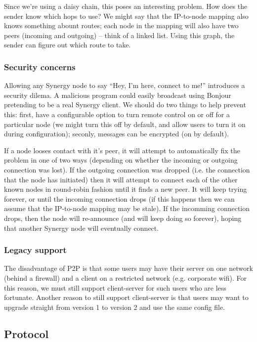Since we're using a daisy chain, this poses an interesting problem. How does
the sender know which hops to use? We might say that the IP-to-node mapping
also knows something abount routes; each node in the mapping will also have two
peers (incoming and outgoing) -- think of a linked list. Using this graph,
the sender can figure out which route to take.

\subsubsection{Security concerns}

Allowing any Synergy node to say ``Hey, I'm here, connect to me!'' introduces
a security dilema. A malicious program could easily broadcast using Bonjour
pretending to be a real Synergy client. We should do two things to help prevent
this: first, have a configurable option to turn remote control on or off for
a particular node (we might turn this off by default, and allow users to turn
it on during configuration); seconly, messages can be encrypted (on by default).

If a node looses contact with it's peer, it will attempt to automatically fix
the problem in one of two ways (depending on whether the incoming or outgoing 
connection was lost). If the outgoing connection was dropped (i.e. the 
connection that the node has initiated) then it will attempt to connect each 
of the other known nodes in round-robin fashion until it finds a new peer. It 
will keep trying forever, or until the incoming connection drops (if this 
happens then we can assume that the IP-to-node mapping may be stale). If
the incomming connection drops, then the node will re-announce (and will keep
doing so forever), hoping that another Synergy node will eventually connect.

\subsubsection{Legacy support}

The disadvantage of P2P is that some users may have their server on one network
(behind a firewall) and a client on a restricted network (e.g. corporate wifi).
For this reason, we must still support client-server for such users who are 
less fortunate. Another reason to still support client-server is that users may
want to upgrade straight from version 1 to version 2 and use the same config 
file.

\subsection{Protocol}

